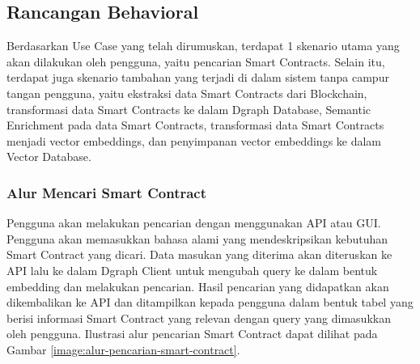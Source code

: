 \subsection{Rancangan Behavioral}

Berdasarkan Use Case yang telah dirumuskan, terdapat 1 skenario utama yang akan dilakukan oleh pengguna, yaitu pencarian Smart Contracts. Selain itu, terdapat juga skenario tambahan yang terjadi di dalam sistem tanpa campur tangan pengguna, yaitu ekstraksi data Smart Contracts dari Blockchain, transformasi data Smart Contracts ke dalam Dgraph Database, Semantic Enrichment pada data Smart Contracts, transformasi data Smart Contracts menjadi vector embeddings, dan penyimpanan vector embeddings ke dalam Vector Database.

\subsubsection{Alur Mencari Smart Contract}

Pengguna akan melakukan pencarian dengan menggunakan API atau GUI. Pengguna akan memasukkan bahasa alami yang mendeskripsikan kebutuhan Smart Contract yang dicari. Data masukan yang diterima akan diteruskan ke API lalu ke dalam Dgraph Client untuk mengubah query ke dalam bentuk embedding dan melakukan pencarian. Hasil pencarian yang didapatkan akan dikembalikan ke API dan ditampilkan kepada pengguna dalam bentuk tabel yang berisi informasi Smart Contract yang relevan dengan query yang dimasukkan oleh pengguna. Ilustrasi alur pencarian Smart Contract dapat dilihat pada Gambar \ref{image:alur-pencarian-smart-contract}.

